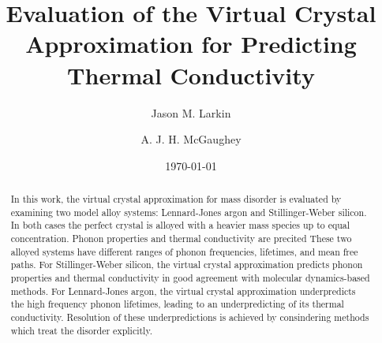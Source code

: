 \documentclass[aps,prb,twocolumn,superscriptaddress,preprintnumbers,amsmath,amssymb,floatfix]{revtex4}
\begin{document}

\title{Evaluation of the Virtual Crystal Approximation for Predicting 
Thermal Conductivity}
\author{Jason M. Larkin}
\author{A. J. H. McGaughey}

\date{\today}


\begin{abstract}
In this work, the virtual crystal approximation for mass disorder is 
evaluated by examining two model alloy systems: Lennard-Jones argon 
and Stillinger-Weber silicon. In both cases the perfect crystal is 
alloyed with a heavier mass species up to equal concentration. 
 Phonon properties and thermal conductivity 
are precited
These 
two alloyed systems have different ranges of phonon frequencies, 
lifetimes, and mean free paths.
For Stillinger-Weber silicon, the 
virtual crystal approximation predicts phonon properties and thermal 
conductivity in good agreement with molecular dynamics-based methods. 
For Lennard-Jones argon, the virtual crystal approximation underpredicts 
the high frequency phonon lifetimes, leading to an underpredicting of 
its thermal conductivity. Resolution of these underpredictions is achieved 
by consindering methods which treat the disorder explicitly. 
\end{abstract}


\maketitle
\clearpage
\end{document}
